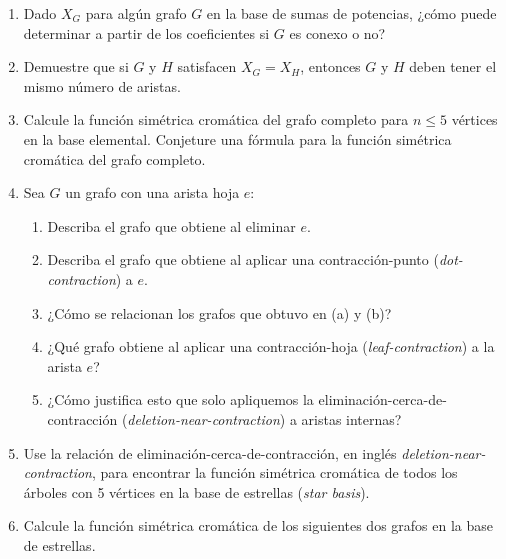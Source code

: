 \documentclass{article}
\begin{document}
\begin{enumerate}
\item Dado $X_G$ para algún grafo $G$ en la base de sumas de potencias, ¿cómo puede determinar a partir de los coeficientes si $G$ es conexo o no?

\item Demuestre que si $G$ y $H$ satisfacen $X_G = X_H$, entonces $G$ y $H$ deben tener el mismo número de aristas.

\item Calcule la función simétrica cromática del grafo completo para $n\leq 5$ vértices en la base elemental. Conjeture una fórmula para la función simétrica cromática del grafo completo.

\item Sea $G$ un grafo con una arista hoja $e$:
\begin{enumerate}
    \item Describa el grafo que obtiene al eliminar $e$.
    \item Describa el grafo que obtiene al aplicar una contracción-punto (\emph{dot-contraction}) a $e$.
    \item ¿Cómo se relacionan los grafos que obtuvo en (a) y (b)?
    \item ¿Qué grafo obtiene al aplicar una contracción-hoja (\emph{leaf-contraction}) a la arista $e$?
    \item ¿Cómo justifica esto que solo apliquemos la eliminación-\allowbreak cerca-de-\allowbreak contracción (\emph{deletion-near-contraction}) a aristas internas?
\end{enumerate}

\item Use la relación de eliminación-cerca-de-contracción, en inglés \emph{deletion-near-contraction}, para encontrar la función simétrica cromática de todos los árboles con 5 vértices en la base de estrellas (\emph{star basis}).

\item Calcule la función simétrica cromática de los siguientes dos grafos en la base de estrellas.

\begin{center}
\hskip 1in 
\begin{tikzpicture}[scale=0.4, auto, 
    vertex/.style={circle, draw, fill=black, minimum size=.5mm}]


\end{tikzpicture}
\end{center}
\end{enumerate}
\end{document}
